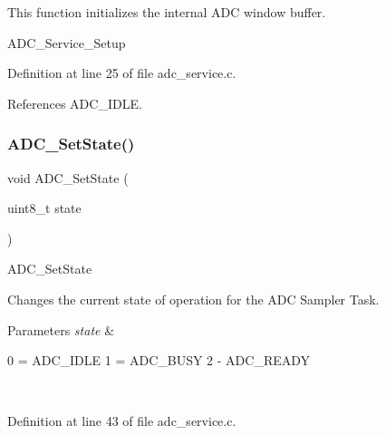 This function initializes the internal A\+DC window buffer. 

A\+D\+C\+\_\+\+Service\+\_\+\+Setup 

Definition at line 25 of file adc\+\_\+service.\+c.



References A\+D\+C\+\_\+\+I\+D\+LE.

\mbox{\label{group___a_d_c_sampler_gac45a9f22b5b35c772350fd69097da95f}} 
\subsubsection{\texorpdfstring{A\+D\+C\+\_\+\+Set\+State()}{ADC\_SetState()}}
{\footnotesize\ttfamily void A\+D\+C\+\_\+\+Set\+State (\begin{DoxyParamCaption}\item[{uint8\+\_\+t}]{state }\end{DoxyParamCaption})}

A\+D\+C\+\_\+\+Set\+State

Changes the current state of operation for the A\+DC Sampler Task. 
\begin{DoxyParams}{Parameters}
{\em state} & 
\begin{DoxyPre}
                0 = ADC\_IDLE
                1 = ADC\_BUSY
                2 - ADC\_READY
            \end{DoxyPre}
 \\
\hline
\end{DoxyParams}


Definition at line 43 of file adc\+\_\+service.\+c.

